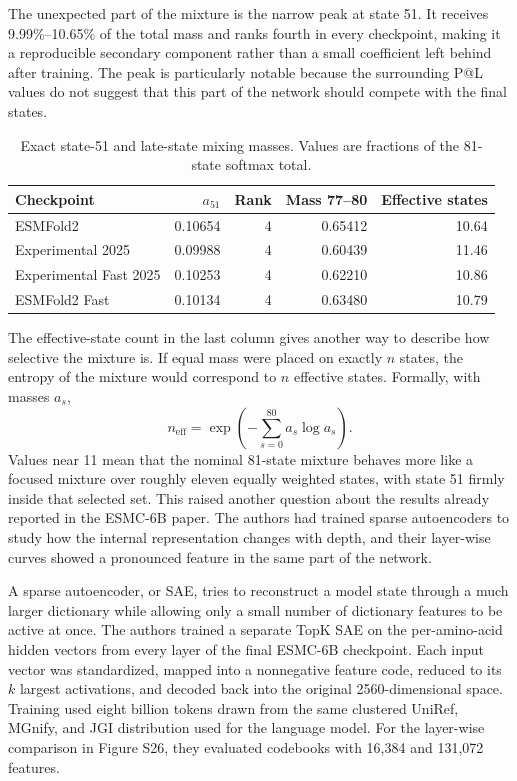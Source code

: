 \documentclass[11pt]{article}
\newcommand{\ESMC}{ESMC-6B\xspace}
\begin{document}
The unexpected part of the mixture is the narrow peak at state 51. It receives 9.99\%--10.65\% of the total mass and ranks fourth in every checkpoint, making it a reproducible secondary component rather than a small coefficient left behind after training. The peak is particularly notable because the surrounding P@L values do not suggest that this part of the network should compete with the final states.

\begin{table}[H]
\centering
\caption{Exact state-51 and late-state mixing masses. Values are fractions of the 81-state softmax total.}
\label{tab:mixer}
\begin{tabular}{@{}lrrrr@{}}
\toprule
Checkpoint & $a_{51}$ & Rank & Mass 77--80 & Effective states \\
\midrule
ESMFold2 & 0.10654 & 4 & 0.65412 & 10.64 \\
Experimental 2025 & 0.09988 & 4 & 0.60439 & 11.46 \\
Experimental Fast 2025 & 0.10253 & 4 & 0.62210 & 10.86 \\
ESMFold2 Fast & 0.10134 & 4 & 0.63480 & 10.79 \\
\bottomrule
\end{tabular}
\end{table}

The effective-state count in the last column gives another way to describe how selective the mixture is. If equal mass were placed on exactly $n$ states, the entropy of the mixture would correspond to $n$ effective states. Formally, with masses $a_s$,
\begin{equation}
n_{\mathrm{eff}}=\exp\!\left(-\sum_{s=0}^{80}a_s\log a_s\right).
\end{equation}
Values near 11 mean that the nominal 81-state mixture behaves more like a focused mixture over roughly eleven equally weighted states, with state 51 firmly inside that selected set. This raised another question about the results already reported in the \ESMC paper. The authors had trained sparse autoencoders to study how the internal representation changes with depth, and their layer-wise curves showed a pronounced feature in the same part of the network.

A sparse autoencoder, or SAE, tries to reconstruct a model state through a much larger dictionary while allowing only a small number of dictionary features to be active at once. The authors trained a separate TopK SAE on the per-amino-acid hidden vectors from every layer of the final \ESMC checkpoint. Each input vector was standardized, mapped into a nonnegative feature code, reduced to its $k$ largest activations, and decoded back into the original 2560-dimensional space. Training used eight billion tokens drawn from the same clustered UniRef, MGnify, and JGI distribution used for the language model. For the layer-wise comparison in Figure S26, they evaluated codebooks with 16,384 and 131,072 features.
\end{document}
